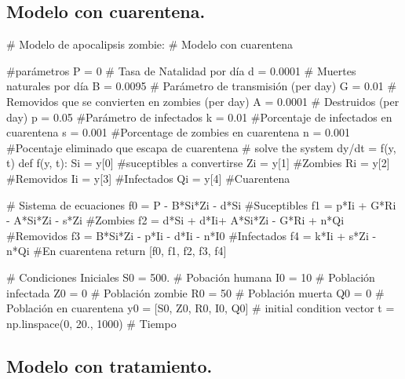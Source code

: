 \documentclass[12pt]{article}
\begin{document}
\subsection*{Modelo con cuarentena.}

\begin{boxedverbatim}
# Modelo de apocalipsis zombie: 
# Modelo con cuarentena

#parámetros
P = 0       # Tasa de Natalidad por día
d = 0.0001  # Muertes naturales por día
B = 0.0095  # Parámetro de transmisión  (per day)
G = 0.01  # Removidos que se convierten en zombies (per day)
A = 0.0001  # Destruidos  (per day)
p = 0.05  #Parámetro de infectados
k = 0.01  #Porcentaje de  infectados en cuarentena
s = 0.001  #Porcentage de zombies en cuarentena
n = 0.001  #Pocentaje eliminado que escapa de cuarentena
# solve the system dy/dt = f(y, t)
def f(y, t):
    Si = y[0] #suceptibles a convertirse
    Zi = y[1] #Zombies
    Ri = y[2] #Removidos
    Ii = y[3] #Infectados
    Qi = y[4] #Cuarentena
    
    # Sistema de ecuaciones
    f0 = P - B*Si*Zi - d*Si #Suceptibles
    f1 = p*Ii + G*Ri - A*Si*Zi - s*Zi #Zombies
    f2 = d*Si + d*Ii+ A*Si*Zi - G*Ri + n*Qi #Removidos
    f3 = B*Si*Zi - p*Ii - d*Ii - n*I0 #Infectados
    f4 = k*Ii + s*Zi - n*Qi #En cuarentena
    return [f0, f1, f2, f3, f4]

# Condiciones Iniciales
S0 = 500.                   # Pobación humana
I0 = 10                     # Población infectada
Z0 = 0                      # Población zombie
R0 = 50                      # Población muerta
Q0 = 0                      # Población en cuarentena
y0 = [S0, Z0, R0, I0, Q0]   # initial condition vector
t  = np.linspace(0, 20., 1000)       # Tiempo
\end{boxedverbatim}

\subsection*{Modelo con tratamiento.}
\end{document}

